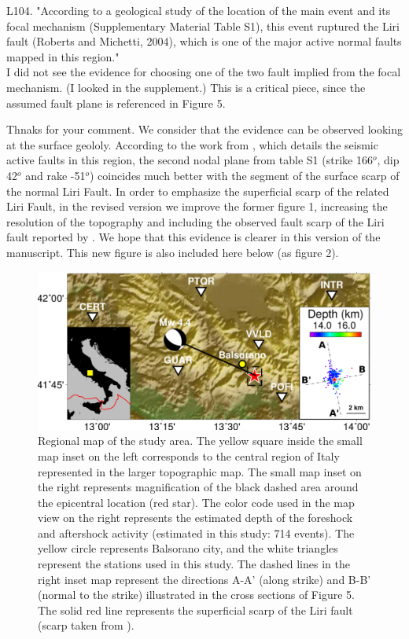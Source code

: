 \documentclass[10pt]{extarticle}
\begin{document}
\begin{ReviewerComment}{1}
\noindent 
L104. "According to a geological study of the location of the main event and its focal mechanism (Supplementary Material Table S1), this event ruptured the Liri fault (Roberts and Michetti, 2004), which is one of the major active normal faults mapped in this region." \\

I did not see the evidence for choosing one of the two fault implied from the focal mechanism. (I looked in the supplement.) This is a critical piece, since the assumed fault plane is referenced in Figure 5.
\end{ReviewerComment}


\begin{Answer}
Thnaks for your comment. We consider that the evidence can be observed looking at the surface geololy. According to the work from \cite{Falcucci2016active}, which details the seismic active faults in this region, the second nodal plane from table S1 (strike 166$^o$, dip 42$^o$ and rake -51$^o$) coincides much better with the segment of the surface scarp of the normal Liri Fault. In order to emphasize the superficial scarp of the related Liri Fault, in the revised version we improve the former figure 1, increasing the resolution of the topography and including the observed fault scarp of the Liri fault reported by \cite{wedmore2017667}. We hope that this evidence is clearer in this version of the manuscript. This new figure is also included here below (as figure 2).
\begin{figure}[!h]
    \centering
     \includegraphics[width=1\linewidth]{map_balsorano.pdf}
    \caption{Regional map of the study area. The yellow square inside the small map inset on the left corresponds to the central region of Italy represented in the larger topographic map. The small map inset on the right represents magnification of the black dashed area around the epicentral location (red star). The color code used in the map view on the right represents the estimated depth of the foreshock and aftershock activity (estimated in this study: 714 events). The yellow circle represents Balsorano city, and the white triangles represent the stations used in this study. The dashed lines in the right inset map represent the directions A-A' (along strike) and B-B' (normal to the strike) illustrated in the cross sections of Figure 5. The solid red line represents the superficial scarp of the Liri fault (scarp taken from \cite{wedmore2017667}).}
\end{figure}
 \WorkInProgressRevTask
\end{Answer}
\end{document}
